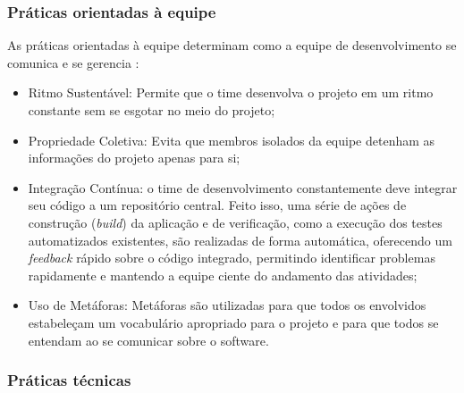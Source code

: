             \subsubsection{Práticas orientadas à equipe}
        
            As práticas orientadas à equipe determinam como a equipe de desenvolvimento se comunica e se gerencia \cite{Martin2020}:
            \begin{itemize}
                \item Ritmo Sustentável: Permite que o time desenvolva o projeto em um ritmo constante sem se esgotar no meio do projeto;
                \item Propriedade Coletiva: Evita que membros isolados da equipe detenham as informações do projeto apenas para si;
                \item Integração Contínua: o time de desenvolvimento constantemente deve integrar seu código a um repositório central. Feito isso, uma série de ações de construção (\emph{build}) da aplicação e de verificação, como a execução dos testes automatizados existentes, são realizadas de forma automática, oferecendo um \emph{feedback} rápido sobre o código integrado, permitindo identificar problemas rapidamente e mantendo a equipe ciente do andamento das atividades;
                \item Uso de Metáforas: Metáforas são utilizadas para que todos os envolvidos estabeleçam um vocabulário apropriado para o projeto e para que todos se entendam ao se comunicar sobre o software.
            \end{itemize}
        
            \subsubsection{Práticas técnicas}
        

